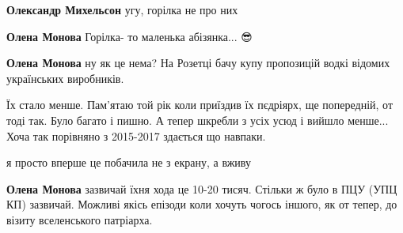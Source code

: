 \begin{itemize}
\begin{itemize}
\textbf{Олександр Михельсон} угу, горілка не про них

 
\textbf{Олена Монова}
Горілка- то маленька абізянка... 😎

 
\textbf{Олена Монова} ну як це нема? На Розетці бачу купу пропозицій водкі відомих українських виробників.
\end{itemize}

 

Їх стало менше. Пам'ятаю той рік коли приїздив їх пєдріярх, ще попередній, от тоді так. Було багато і пишно.
А тепер шкребли з усіх усюд і вийшло менше...
Хоча так порівняно з 2015-2017 здається що навпаки.

\begin{itemize}
 
я просто вперше це побачила не з екрану, а вживу

 
\textbf{Олена Монова} зазвичай їхня хода це 10-20 тисяч. Стільки ж було в ПЦУ (УПЦ КП) зазвичай.
Можливі якісь епізоди коли хочуть чогось іншого, як от тепер, до візиту вселенського патріарха.

 

\end{itemize}
\end{itemize}
